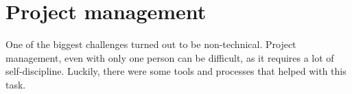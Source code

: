 \section{Project management}\label{sec:project-management}

One of the biggest challenges turned out to be non-technical.
Project management,
even with only one person can be difficult,
as it requires a lot of self-discipline.
Luckily, there were some tools and processes that helped with this task.




